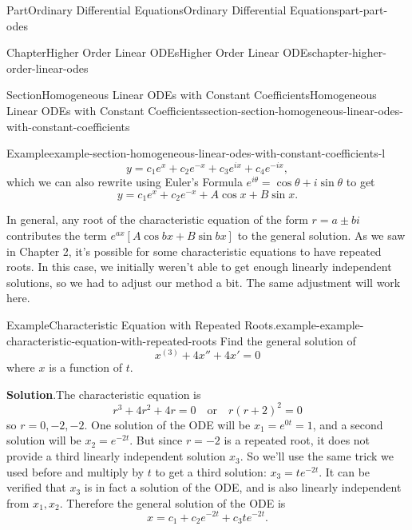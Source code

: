 \documentclass[twoside,10pt,]{book}
\newcommand{\blocktitlefont}{\relax}
\numberwithin{equation}{part}
\newcommand{\brackets}[1]{\left[ #1 \right]}
\begin{document}
\begin{partptx}{Part}{Ordinary Differential Equations}{}{Ordinary Differential Equations}{}{}{part-part-odes}
\begin{chapterptx}{Chapter}{Higher Order Linear ODEs}{}{Higher Order Linear ODEs}{}{}{chapter-higher-order-linear-odes}
\begin{sectionptx}{Section}{Homogeneous Linear ODEs with Constant Coefficients}{}{Homogeneous Linear ODEs with Constant Coefficients}{}{}{section-section-homogeneous-linear-odes-with-constant-coefficients}
\begin{example}{Example}{}{example-section-homogeneous-linear-odes-with-constant-coefficients-l}
\begin{equation*}
y = c_{1}e^{x}+c_{2}e^{-x}+c_{3}e^{ix}+c_{4}e^{-ix},
\end{equation*}
which we can also rewrite using Euler's Formula \(e^{i\theta} = \cos\theta+i\sin\theta\) to get%
\begin{equation*}
y = c_{1}e^{x}+c_{2}e^{-x}+A\cos x+B\sin x.
\end{equation*}
%
\end{example}
In general, any root of the characteristic equation of the form \(r=a\pm bi\) contributes the term \(e^{ax}\brackets{A\cos bx+B\sin bx}\) to the general solution. As we saw in Chapter 2, it's possible for some characteristic equations to have repeated roots. In this case, we initially weren't able to get enough linearly independent solutions, so we had to adjust our method a bit. The same adjustment will work here.%
\begin{example}{Example}{Characteristic Equation with Repeated Roots.}{example-example-characteristic-equation-with-repeated-roots}%
Find the general solution of%
\begin{equation*}
x^{(3)}+4x''+4x'=0
\end{equation*}
where \(x\) is a function of \(t\).%
\par\smallskip%
\noindent\textbf{\blocktitlefont Solution}.\hypertarget{solution-example-characteristic-equation-with-repeated-roots-c}{}\quad{}The characteristic equation is%
\begin{equation*}
r^{3}+4r^{2}+4r = 0\quad\text{or}\quad r(r+2)^{2}=0
\end{equation*}
so \(r=0,-2,-2\). One solution of the ODE will be \(x_{1} = e^{0t} = 1\), and a second solution will be \(x_{2} = e^{-2t}\). But since \(r=-2\) is a repeated root, it does not provide a third linearly independent solution \(x_{3}\). So we'll use the same trick we used before and multiply by \(t\) to get a third solution: \(x_{3} = te^{-2t}\). It can be verified that \(x_{3}\) is in fact a solution of the ODE, and is also linearly independent from \(x_{1},x_{2}\). Therefore the general solution of the ODE is%
\begin{equation*}
x = c_{1}+c_{2}e^{-2t}+c_{3}te^{-2t}.
\end{equation*}
%
\end{example}

\end{sectionptx}
\end{chapterptx}
\end{partptx}
\end{document}
